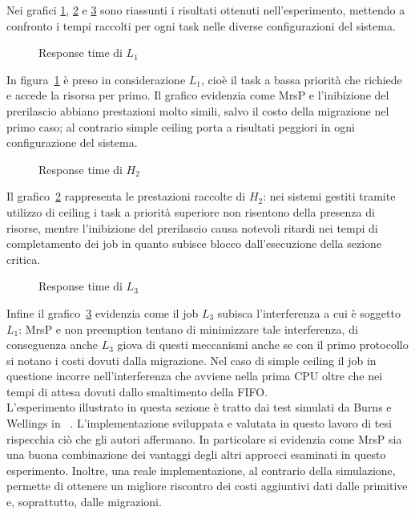 Nei grafici \ref{fig:test_protocols_L1}, \ref{fig:test_protocols_H2} e \ref{fig:test_protocols_L3} sono riassunti i risultati ottenuti nell'esperimento, mettendo a confronto i tempi raccolti per ogni task nelle diverse configurazioni del sistema.\\

\begin{figure}
  \centering
  \confrontoProtocolliLUno
  \caption{Response time di $L_1$}
  \label{fig:test_protocols_L1}
\end{figure}

In figura~\ref{fig:test_protocols_L1} è preso in considerazione $L_1$, cioè il task a bassa priorità che richiede e accede la risorsa per primo. Il grafico evidenzia come MrsP e l'inibizione del prerilascio abbiano prestazioni molto simili, salvo il costo della migrazione nel primo caso; al contrario simple ceiling porta a risultati peggiori in ogni configurazione del sistema.\\

\begin{figure}
  \centering
  \confrontoProtocolliHDue
  \caption{Response time di $H_2$}
  \label{fig:test_protocols_H2}
\end{figure}

Il grafico~\ref{fig:test_protocols_H2} rappresenta le prestazioni raccolte di $H_2$: nei sistemi gestiti tramite utilizzo di ceiling i task a priorità superiore non risentono della presenza di risorse, mentre l'inibizione del prerilascio causa notevoli ritardi nei tempi di completamento dei job in quanto subisce blocco dall'esecuzione della sezione critica.\\

\begin{figure}
  \centering
  \confrontoProtocolliLTre
  \caption{Response time di $L_3$}
  \label{fig:test_protocols_L3}
\end{figure}

Infine il grafico~\ref{fig:test_protocols_L3} evidenzia come il job $L_3$ subisca l'interferenza a cui è soggetto $L_1$: MrsP e non preemption tentano di minimizzare tale interferenza, di conseguenza anche $L_3$ giova di questi meccanismi anche se con il primo protocollo si notano i costi dovuti dalla migrazione. Nel caso di simple ceiling il job in questione incorre nell'interferenza che avviene nella prima CPU oltre che nei tempi di attesa dovuti dallo smaltimento della FIFO.\\

L'esperimento illustrato in questa sezione è tratto dai test simulati da Burns e Wellings in ~\cite{Burns:2013:SCM:2547348.2547350}. L'implementazione sviluppata e valutata in questo lavoro di tesi rispecchia ciò che gli autori affermano. In particolare si evidenzia come MrsP sia una buona combinazione dei vantaggi degli altri approcci esaminati in questo esperimento. Inoltre, una reale implementazione, al contrario della simulazione, permette di ottenere un migliore riscontro dei costi aggiuntivi dati dalle primitive e, soprattutto, dalle migrazioni.\\

